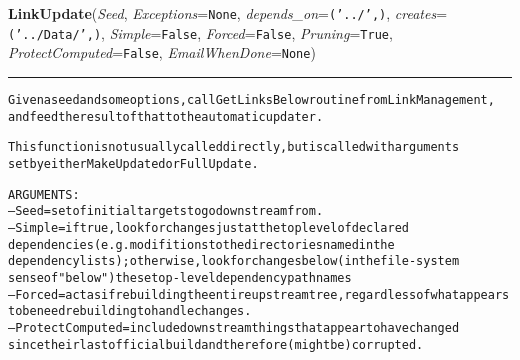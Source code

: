 \hspace{.8\funcindent}\begin{boxedminipage}{\funcwidth}

    \raggedright \textbf{LinkUpdate}(\textit{Seed}, \textit{Exceptions}={\tt None}, \textit{depends\_on}={\tt ('../',)}, \textit{creates}={\tt ('../Data/',)}, \textit{Simple}={\tt False}, \textit{Forced}={\tt False}, \textit{Pruning}={\tt True}, \textit{ProtectComputed}={\tt False}, \textit{EmailWhenDone}={\tt None})

    \vspace{-1.5ex}

    \rule{\textwidth}{0.5\fboxrule}
\setlength{\parskip}{2ex}
\begin{alltt}

Given a seed and some options, call GetLinksBelow routine from LinkManagement, 
and feed the result of that to the automatic updater. 

This function is not usually called directly, but is called with arguments 
set by either MakeUpdated or FullUpdate. 

ARGUMENTS:
--Seed = set of initial targets to go downstream from.  
--Simple = if true, look for changes just at the top level of declared 
        dependencies (e.g. modifitions to the directories named in the 
        dependency lists);  otherwise, look for changes below (in the file-system 
        sense of "below") these top-level dependency path names
--Forced = act as if rebuilding the entire upstream tree, regardless of what appears 
        to be need rebuilding to handle changes. 
--ProtectComputed = include downstream things that appear to have changed 
since their last official build and therefore (might be) corrupted.             
\end{alltt}

\setlength{\parskip}{1ex}
    \end{boxedminipage}

    \label{System:Update:UpdateLinks}

    \vspace{0.5ex}

